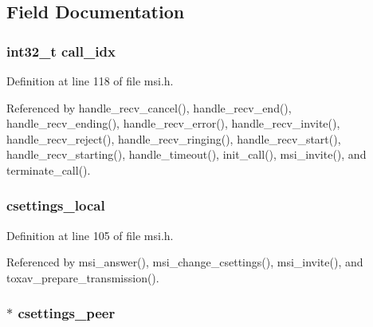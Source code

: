 \subsection{Field Documentation}
\hypertarget{struct___m_s_i_call_ad6b287fd08a0cc466cd41bd2e76d5808}{
\subsubsection[{call\+\_\+idx}]{\setlength{\rightskip}{0pt plus 5cm}int32\+\_\+t call\+\_\+idx}}\label{struct___m_s_i_call_ad6b287fd08a0cc466cd41bd2e76d5808}


Definition at line 118 of file msi.\+h.



Referenced by handle\+\_\+recv\+\_\+cancel(), handle\+\_\+recv\+\_\+end(), handle\+\_\+recv\+\_\+ending(), handle\+\_\+recv\+\_\+error(), handle\+\_\+recv\+\_\+invite(), handle\+\_\+recv\+\_\+reject(), handle\+\_\+recv\+\_\+ringing(), handle\+\_\+recv\+\_\+start(), handle\+\_\+recv\+\_\+starting(), handle\+\_\+timeout(), init\+\_\+call(), msi\+\_\+invite(), and terminate\+\_\+call().

\hypertarget{struct___m_s_i_call_ae57cfc81fffd82f53953c6546bb9f3c3}{
\subsubsection[{csettings\+\_\+local}]{ csettings\+\_\+local}}\label{struct___m_s_i_call_ae57cfc81fffd82f53953c6546bb9f3c3}


Definition at line 105 of file msi.\+h.



Referenced by msi\+\_\+answer(), msi\+\_\+change\+\_\+csettings(), msi\+\_\+invite(), and toxav\+\_\+prepare\+\_\+transmission().

\hypertarget{struct___m_s_i_call_a3b7fc70c2772bbdc453eeff763fc0b4c}{
\subsubsection[{csettings\+\_\+peer}]{$\ast$ csettings\+\_\+peer}}\label{struct___m_s_i_call_a3b7fc70c2772bbdc453eeff763fc0b4c}


